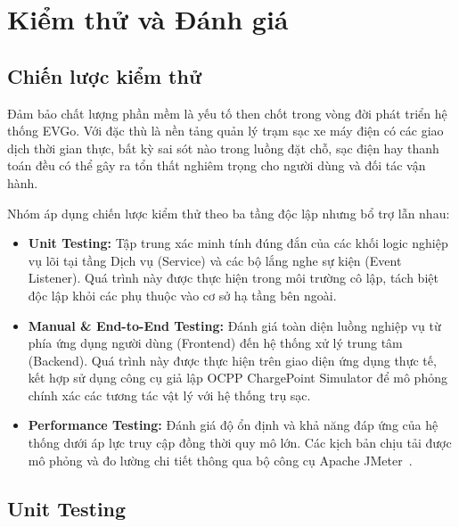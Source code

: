 \section{Kiểm thử và Đánh giá}

\subsection{Chiến lược kiểm thử}
\hspace*{\parindent}
Đảm bảo chất lượng phần mềm là yếu tố then chốt trong vòng đời phát triển
hệ thống EVGo. Với đặc thù là nền tảng quản lý trạm sạc xe máy điện có các giao dịch
thời gian thực, bất kỳ sai sót nào trong luồng đặt chỗ, sạc điện hay thanh toán
đều có thể gây ra tổn thất nghiêm trọng cho người dùng và đối tác vận hành.

Nhóm áp dụng chiến lược kiểm thử theo ba tầng độc lập nhưng bổ trợ lẫn nhau:

\begin{itemize}
    \item \textbf{Unit Testing:} Tập trung xác minh tính đúng đắn của các khối logic nghiệp vụ lõi tại tầng Dịch vụ (Service) và các bộ lắng nghe sự kiện (Event Listener). Quá trình này được thực hiện trong môi trường cô lập, tách biệt độc lập khỏi các phụ thuộc vào cơ sở hạ tầng bên ngoài.

    \item \textbf{Manual \& End-to-End Testing:} Đánh giá toàn diện luồng nghiệp vụ từ phía ứng dụng người dùng (Frontend) đến hệ thống xử lý trung tâm (Backend). Quá trình này được thực hiện trên giao diện ứng dụng thực tế, kết hợp sử dụng công cụ giả lập OCPP ChargePoint Simulator để mô phỏng chính xác các tương tác vật lý với hệ thống trụ sạc.

    \item \textbf{Performance Testing:} Đánh giá độ ổn định và khả năng đáp ứng của hệ thống dưới áp lực truy cập đồng thời quy mô lớn. Các kịch bản chịu tải được mô phỏng và đo lường chi tiết thông qua bộ công cụ Apache JMeter~\cite{jmeter}.
\end{itemize}

\subsection{Unit Testing}

